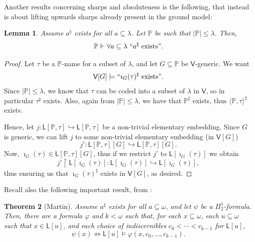\documentclass[10pt]{amsart}
\renewcommand\le\leqslant
\newtheorem{theorem}{Theorem}[section]
\newtheorem{lemma}[theorem]{Lemma}
\theoremstyle{definition}
\begin{document}

Another results concerning sharps and absoluteness is the following, that instead is about lifting upwards sharps already present in the ground model:

\begin{lemma}\label{abs2}
    Assume $a^\sharp$ exists for all $a\subseteq\lambda$. Let $\mathbb P$ be such that $|\mathbb P|\le\lambda$. Then,
    \[\mathbb P \Vdash \forall a\subseteq\lambda\ ``a^\sharp\ \text{exists}".\]
\end{lemma}

\begin{proof}
Let $\tau$ be a $\mathbb P$-name for a subset of $\lambda$, and let $G\subseteq\mathbb P$ be $\mathsf V$-generic. We want
\[\mathsf V[G]\models ``\imath_G(\tau)^\sharp\text{ exists}".\]
Since $|\mathbb P|\le\lambda$, we know that $\tau$ can be coded into a subset of $\lambda$ in $\mathsf V$, so in particular $\tau^\sharp$ exists. Also, again from $|\mathbb P|\le\lambda$, we have that $\mathbb P^\sharp$ exists, thus $\langle \mathbb P,\tau\rangle^\sharp$ exists.\medskip

Hence, let $j:\mathsf L[\mathbb P,\tau]\hookrightarrow \mathsf L[\mathbb P,\tau]$ be a non-trivial elementary embedding. Since $G$ is generic, we can lift $j$ to some non-trivial elementary embedding (in $\mathsf V[G]$) \[j':\mathsf L[\mathbb P,\tau][G]\hookrightarrow \mathsf L[\mathbb P,\tau][G].\]
Now, $\imath_G(\tau)\in \mathsf L[\mathbb P,\tau][G]$, thus if we restrict $j'$ to $\mathsf L[\imath_G(\tau)]$ we obtain
\[j'\upharpoonright \mathsf L[\imath_G(\tau)]: \mathsf L[\imath_G(\tau)]\hookrightarrow \mathsf L[\imath_G(\tau)],\]
thus ensuring us that $\imath_G(\tau)^\sharp$ exists in $\mathsf V[G]$, as desired.
\end{proof}

Recall also the following important result, from \cite{Martthisthat}:

\begin{theorem}[Martin]\label{martincountable}
Assume $a^\sharp$ exists for all $a\subseteq\omega$, and let $\psi$ be a $\Pi^1_2$-formula. Then, there are a formula $\varphi$ and $k<\omega$ such that, for each $x\subseteq\omega$, each $u\subseteq\omega$ such that $x\in \mathsf L[u]$, and each choice of indiscernibles $c_0<\cdots<c_{k-1}$ for $\mathsf L[u]$,
\[\psi(x) \Leftrightarrow \mathsf L[u]\models \varphi(x,c_0,\ldots,c_{k-1}).\]
\end{theorem}
\end{document}
